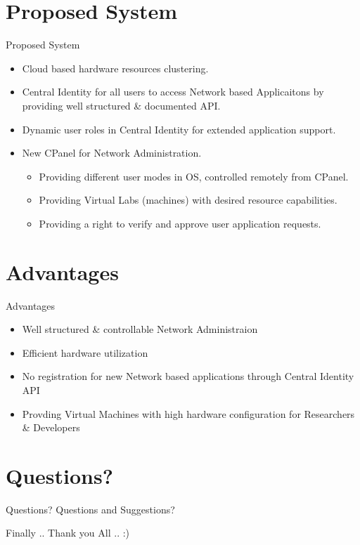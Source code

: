 \documentclass[xcolor=dvipsnames]{beamer}
\begin{document}
\section{Proposed System}
\begin{frame}{Proposed System}
\begin{itemize}
	\item Cloud based hardware resources clustering.
	\item Central Identity for all users to access Network based Applicaitons by providing well structured \& documented API.
	\item Dynamic user roles in Central Identity for extended application support.
	\item New CPanel for Network Administration.
		\begin{itemize}
			\item Providing different user modes in OS, controlled remotely from CPanel.
			\item Providing Virtual Labs (machines) with desired resource capabilities.
			\item Providing a right to verify and approve user application requests.
		\end{itemize}
\end{itemize}
\end{frame}

\section{Advantages}
\begin{frame}{Advantages}
\begin{itemize}
	\item Well structured \& controllable Network Administraion
	\item Efficient hardware utilization
	\item No registration for new Network based applications through Central Identity API
	\item Provding Virtual Machines with high hardware configuration for Researchers \& Developers
\end{itemize}

\end{frame}

\section{Questions?}
\begin{frame}{Questions?}
\centering
Questions and Suggestions? 
\end{frame}


\begin{frame}{Finally ..}
Thank you All .. :)
\end{frame}
\end{document}
